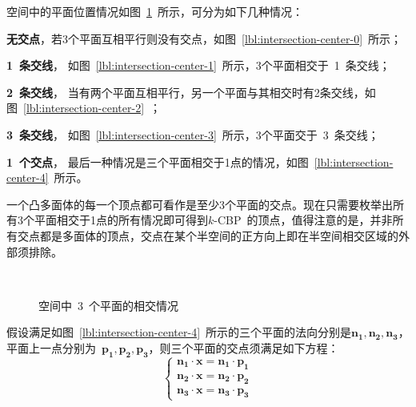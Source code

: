 空间中的平面位置情况如图~\ref{fig:three-planes-intersection}~所示，可分为如下几种情况：
\begin{inparaenum}[(1)]
\item \textbf{无交点}，若3个平面互相平行则没有交点，如图~\ref{lbl:intersection-center-0}~所示；
\item \textbf{1~条交线}， 如图~\ref{lbl:intersection-center-1}~所示，3个平面相交于~1~条交线；
\item \textbf{2~条交线}， 当有两个平面互相平行，另一个平面与其相交时有2条交线，如图~\ref{lbl:intersection-center-2}~；
\item \textbf{3~条交线}， 如图~\ref{lbl:intersection-center-3}~所示，3个平面交于~3~条交线；
\item \textbf{1~个交点}， 最后一种情况是三个平面相交于1点的情况，如图~\ref{lbl:intersection-center-4}~所示。
\end{inparaenum}

一个凸多面体的每一个顶点都可看作是至少3个平面的交点。现在只需要枚举出所有3个平面相交于1点的所有情况即可得到$k$-CBP~的顶点，值得注意的是，并非所有交点都是多面体的顶点，交点在某个半空间的正方向上即在半空间相交区域的外部须排除。

\begin{figure}[htbp]
  \centering
  \hspace{1em}%
  \hspace{1em}%
  \\
  \caption{空间中~3~个平面的相交情况}
  \label{fig:three-planes-intersection}
\end{figure}

假设满足如图~\ref{lbl:intersection-center-4}~所示的三个平面的法向分别是$\bm{n_1}, \bm{n_2}, \bm{n_3}$，
平面上一点分别为~$\bm{p_1}, \bm{p_2}, \bm{p_3}$，则三个平面的交点须满足如下方程： 
\begin{equation}
  \label{equa:three-planes-intersection}
  \left\{
    \begin{array}{l}
      \bm{n_1} \cdot \bm{x} = \bm{n_1} \cdot \bm{p_1}\\
      \bm{n_2} \cdot \bm{x} = \bm{n_2} \cdot \bm{p_2}\\
      \bm{n_3} \cdot \bm{x} = \bm{n_3} \cdot \bm{p_3}
    \end{array}
    \right.
\end{equation}

